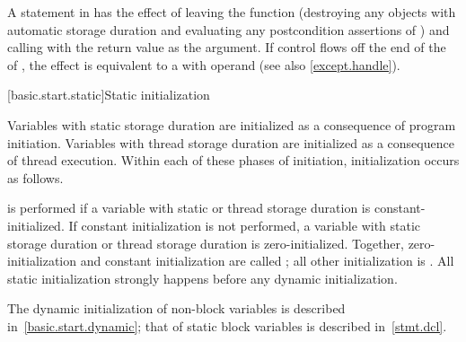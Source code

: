 \pnum
{}%
%
A  statement in  has the effect of leaving the 
function (destroying any objects with automatic storage duration
and evaluating any postcondition assertions of )
and calling  with the return value as the argument.
If control flows off the end of
the  of ,
the effect is equivalent to a  with operand 
(see also \ref{except.handle}).

[basic.start.static]{Static initialization}

\pnum
{}%
%
Variables with static storage duration
are initialized as a consequence of program initiation. Variables with
thread storage duration are initialized as a consequence of thread execution.
Within each of these phases of initiation, initialization occurs as follows.

\pnum
{}%
 is performed
if a variable with static or thread storage duration
is constant-initialized.
%
If constant initialization is not performed, a variable with static
storage duration or thread storage
duration is zero-initialized.
Together, zero-initialization and constant initialization are called
;
all other initialization is .
All static initialization strongly happens before
any dynamic initialization.
\begin{note}
The dynamic initialization of non-block variables is described
in~\ref{basic.start.dynamic}; that of static block variables is described
in~\ref{stmt.dcl}.
\end{note}

